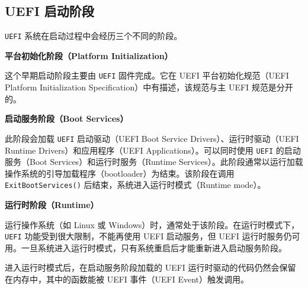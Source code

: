 \subsection{UEFI 启动阶段}

\texttt{UEFI} 系统在启动过程中会经历三个不同的阶段。

\textbf{平台初始化阶段（Platform Initialization）}

这个早期启动阶段主要由 \texttt{UEFI} 固件完成。它在 UEFI 平台初始化规范（UEFI Platform Initialization Specification）中有描述，该规范与主 UEFI 规范是分开的。

\textbf{启动服务阶段（Boot Services）}

此阶段会加载 \texttt{UEFI} 启动驱动（UEFI Boot Service Drivers）、运行时驱动（UEFI Runtime Drivers）和应用程序（UEFI Applications）。可以同时使用 \texttt{UEFI} 的启动服务（Boot Services）和运行时服务（Runtime Services）。此阶段通常以运行加载操作系统的引导加载程序（bootloader）为结束。该阶段在调用 \texttt{ExitBootServices()} 后结束，系统进入运行时模式（Runtime mode）。

\textbf{运行时阶段（Runtime）}

运行操作系统（如 Linux 或 Windows）时，通常处于该阶段。在运行时模式下，\texttt{UEFI} 功能受到很大限制，不能再使用 UEFI 启动服务，但 UEFI 运行时服务仍可用。一旦系统进入运行时模式，只有系统重启后才能重新进入启动服务阶段。

进入运行时模式后，在启动服务阶段加载的 UEFI 运行时驱动的代码仍然会保留在内存中，其中的函数能被 UEFI 事件（UEFI Event）触发调用。